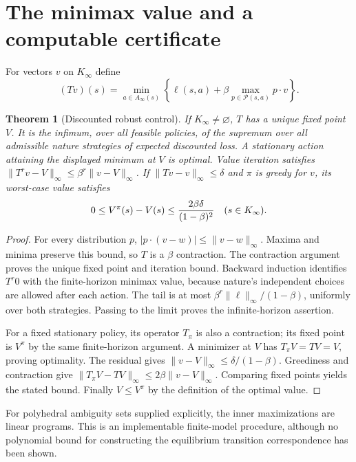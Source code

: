 \documentclass[11pt,a4paper]{article}
\newtheorem{theorem}{Theorem}[section]
\theoremstyle{definition}
\theoremstyle{remark}
\begin{document}
\section{The minimax value and a computable certificate}
For vectors $v$ on $K_\infty$ define
\[
 (Tv)(s)=\min_{a\in A_\infty(s)}\left\{\ell(s,a)+
     \beta\max_{p\in\mathcal P(s,a)}p\cdot v\right\}.
\]
\begin{theorem}[Discounted robust control]
If $K_\infty\ne\varnothing$, $T$ has a unique fixed point $V$. It is the infimum, over all feasible policies, of the supremum over all admissible nature strategies of expected discounted loss. A stationary action attaining the displayed minimum at $V$ is optimal. Value iteration satisfies
$\|T^r v-V\|_\infty\le\beta^r\|v-V\|_\infty$.
If $\|Tv-v\|_\infty\le\delta$ and $\pi$ is greedy for $v$, its worst-case value satisfies
\[
 0\le V^\pi(s)-V(s)\le {2\beta\delta\over(1-\beta)^2}
 \quad(s\in K_\infty).
\]
\end{theorem}
\begin{proof}
For every distribution $p$, $|p\cdot(v-w)|\le\|v-w\|_\infty$. Maxima and minima preserve this bound, so $T$ is a $\beta$ contraction. The contraction argument proves the unique fixed point and iteration bound. Backward induction identifies $T^r0$ with the finite-horizon minimax value, because nature's independent choices are allowed after each action. The tail is at most $\beta^r\|\ell\|_\infty/(1-\beta)$, uniformly over both strategies. Passing to the limit proves the infinite-horizon assertion.

For a fixed stationary policy, its operator $T_\pi$ is also a contraction; its fixed point is $V^\pi$ by the same finite-horizon argument. A minimizer at $V$ has $T_\pi V=TV=V$, proving optimality. The residual gives $\|v-V\|_\infty\le\delta/(1-\beta)$. Greediness and contraction give
$\|T_\pi V-TV\|_\infty\le2\beta\|v-V\|_\infty$.
Comparing fixed points yields the stated bound. Finally $V\le V^\pi$ by the definition of the optimal value.
\end{proof}
For polyhedral ambiguity sets supplied explicitly, the inner maximizations are linear programs. This is an implementable finite-model procedure, although no polynomial bound for constructing the equilibrium transition correspondence has been shown.
\end{document}
